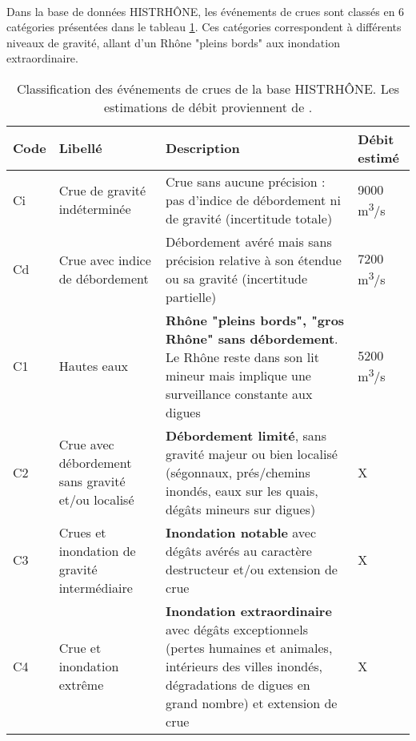 \documentclass[11pt]{article}
\begin{document}
	\paragraph{} Dans la base de données HISTRHÔNE, les événements de crues sont classés en 6 catégories présentées dans le tableau \ref{tab:CatCrueHistrhone}. Ces catégories correspondent à différents niveaux de gravité, allant d'un Rhône "pleins bords" aux inondation extraordinaire. 
	
\begin{table}[h]
	\centering
	\caption{Classification des événements de crues de la base HISTRHÔNE. Les estimations de débit proviennent de \citet{pichard_hydro-climatology_2017}.}
	\label{tab:CatCrueHistrhone}
		\begin{tabular}{|m{1cm}|m{5cm}|m{8cm}|m{2.5cm}|}
		\hline
		Code &
		  Libellé &
		  Description &
		  Débit estimé \\ \hline
		Ci &
		  Crue de gravité indéterminée &
		  Crue sans aucune précision : pas d'indice de débordement ni de gravité (incertitude totale) &
		  9000 m\textsuperscript{3}/s \\ \hline
		Cd &
		  Crue avec indice de débordement &
		  Débordement avéré mais sans précision relative à son étendue ou sa gravité (incertitude partielle) &
		  7200 m\textsuperscript{3}/s \\ \hline
		C1 &
		  Hautes eaux &
		  
\textbf{Rhône "pleins bords", "gros Rhône" sans débordement}. Le Rhône reste dans son lit mineur mais implique une surveillance constante aux digues &
		  5200 m\textsuperscript{3}/s \\ \hline
		C2 &
		  Crue avec débordement sans gravité et/ou localisé &
		 
\textbf{Débordement limité}, sans gravité majeur ou bien localisé (ségonnaux, prés/chemins inondés, eaux sur les quais, dégâts mineurs sur digues) &
		  X \\ \hline
		C3 &
		  Crues et inondation de gravité intermédiaire &
		  
\textbf{Inondation notable} avec dégâts avérés au caractère destructeur et/ou extension de crue &
		  X \\ \hline
		C4 &
		  Crue et inondation extrême &
\textbf{Inondation extraordinaire} avec dégâts exceptionnels (pertes humaines et animales, intérieurs des villes inondés, dégradations de digues en grand nombre) et extension de crue &
		  X \\ \hline
		\end{tabular}
\end{table}
	
\end{document}
